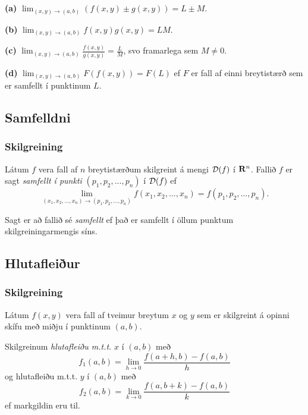 {\bf (a)}  $\lim_{(x,y)\rightarrow (a,b)}(f(x,y)\pm g(x,y))=L\pm M$.

{\bf (b)}  $\lim_{(x,y)\rightarrow (a,b)}f(x,y) g(x,y)=LM$.

{\bf (c)}  $\lim_{(x,y)\rightarrow (a,b)}\frac{f(x,y)}{g(x,y)}=
\frac{L}{M}$, svo framarlega sem $M\neq 0$.

{\bf (d)}  $\lim_{(x,y)\rightarrow (a,b)}F(f(x,y))=F(L)$ ef $F$ er fall af einni breytistærð sem er samfellt í punktinum $L$.
 
 




\subsection{Samfelldni}
 \subsubsection{Skilgreining }
   Látum $f$ vera fall af $n$ breytistærðum skilgreint á mengi ${\cal D}(f)$ í $\mbox{${\bf R}^n$}$.  Fallið $f$ er sagt {\em samfellt í punkti} $ (p_1,p_2,\ldots,p_n)$ í ${\cal D}(f)$  ef 
$$\lim_{(x_1,x_2,\ldots,x_n)\rightarrow (p_1,p_2,\ldots,p_n)}
f(x_1,x_2,\ldots,x_n)=f(p_1,p_2,\ldots,p_n).$$

Sagt er að fallið sé {\em samfellt} ef það er samfellt í öllum punktum skilgreiningarmengis síns.

 


\subsection{Hlutafleiður}
\subsubsection{Skilgreining }
 Látum $f(x,y)$ vera fall af tveimur breytum $x$ og $y$ sem er skilgreint á opinni skífu með miðju í punktinum $(a,b)$. 
 
 \medskip
 Skilgreinum \emph{hlutafleiðu m.t.t.} $x$ í $(a,b)$ með
$$f_1(a,b)=\lim_{h\rightarrow 0}\frac{f(a+h,b)-f(a,b)}{h}$$
og {hlutafleiðu m.t.t.} $y$ í $(a,b)$ með
$$f_2(a,b)=\lim_{k\rightarrow 0}\frac{f(a,b+k)-f(a,b)}{k}$$ ef markgildin eru til.


